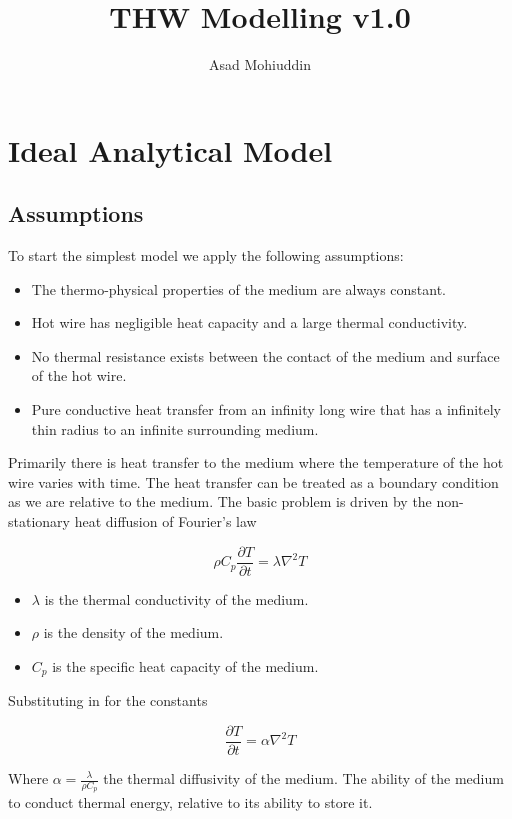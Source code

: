\documentclass{article}
\author{Asad Mohiuddin}
\title{THW Modelling v1.0}
\begin{document}
\setlength{\parindent}{0pt}
\clearpage \maketitle
\thispagestyle{empty} %

\newpage \setcounter{page}{1}
\section{Ideal Analytical Model}
\subsection{Assumptions}
To start the simplest model we apply the following assumptions:
	\begin{itemize}
		\item{The thermo-physical properties of the medium are always constant.}
		\item{Hot wire has negligible heat capacity and a large thermal conductivity.}
		\item{No thermal resistance exists between the contact of the medium and surface of the hot wire.} 
		\item{Pure conductive heat transfer from an infinity long wire that has a  infinitely thin radius to an infinite surrounding medium.}
	\end{itemize}

Primarily there is heat transfer to the medium where the temperature of the hot wire varies with time. The heat transfer can be treated as a boundary condition as we are relative to the medium. The basic problem is driven by the non-stationary heat diffusion of Fourier's law

$$\rho C_p \frac{\partial T}{\partial t} = \lambda \nabla^2T $$
 \begin{itemize}
 	\item[] $\lambda$ is the thermal conductivity of the medium.
 	\item[] $\rho$ is the density of the medium.
 	\item[] $C_p$ is the specific heat capacity of the medium.
 \end{itemize}

Substituting in for the constants

$$ \frac{\partial T}{\partial t} = \alpha \nabla^2T $$

Where $\alpha = \frac{\lambda}{\rho C_p}$ the thermal diffusivity of the medium. The ability of the medium to conduct thermal energy, relative to its ability to store it.
\end{document}
